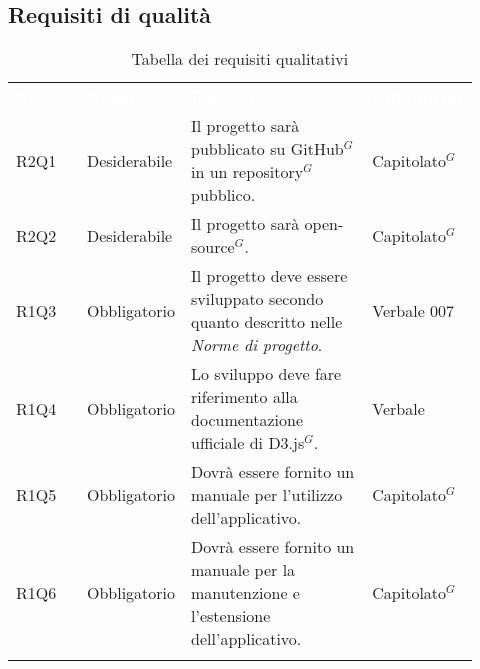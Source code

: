 \subsection{Requisiti di qualità}
{\renewcommand{\arraystretch}{1.5}
\begin{longtable}{p{0.12\linewidth}p{0.15\linewidth}p{0.50\linewidth}p{0.15\linewidth}}
	\rowcolor[RGB]{33, 73, 50}
	\textcolor{white}{\textbf{Codice}} & \textcolor{white}{\textbf{Classe}} & \textcolor{white}{\textbf{Descrizione}} &
    \textcolor{white}{\textbf{Riferimenti}}\\
    
    \rowcolor[RGB]{216, 235, 171}
    R2Q1 & Desiderabile & Il progetto sarà pubblicato su GitHub$^{G}$ in un repository$^{G}$ pubblico. & Capitolato$^{G}$\\
    \rowcolor[RGB]{233, 245, 206}
    R2Q2 & Desiderabile & Il progetto sarà open-source$^{G}$. & Capitolato$^{G}$\\ 
    \rowcolor[RGB]{216, 235, 171}
    R1Q3 & Obbligatorio & Il progetto deve essere sviluppato secondo quanto descritto nelle \textit{Norme di progetto}. & Verbale 007 \\
    \rowcolor[RGB]{233, 245, 206}
    R1Q4 & Obbligatorio & Lo sviluppo deve fare riferimento alla documentazione ufficiale di D3.js$^{G}$. & Verbale\\
    \rowcolor[RGB]{216, 235, 171}
    R1Q5 & Obbligatorio & Dovrà essere fornito un manuale per l'utilizzo dell'applicativo. & Capitolato$^{G}$\\
    \rowcolor[RGB]{233, 245, 206}
    R1Q6 & Obbligatorio & Dovrà essere fornito un manuale per la manutenzione e l'estensione dell'applicativo. & Capitolato$^{G}$\\ 
    
    \caption{Tabella dei requisiti qualitativi}
\end{longtable}	
}

